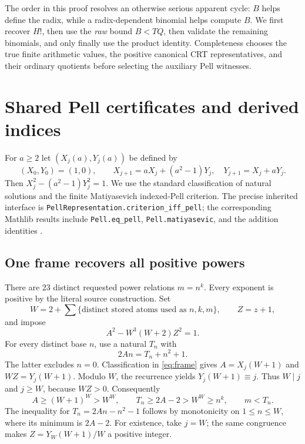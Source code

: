 \documentclass[10pt,letterpaper]{article}
\theoremstyle{definition}\newtheorem{definition}[theorem]{Definition}
\theoremstyle{remark}\newtheorem{remark}[theorem]{Remark}
\newcommand{\file}[1]{\texttt{\nolinkurl{#1}}}
\begin{document}
The order in this proof resolves an otherwise serious apparent cycle:
$B$ helps define the radix, while a radix-dependent binomial helps
compute $B$. We first recover $H!$, then use the \emph{raw} bound $B<TQ$,
then validate the remaining binomials, and only finally use the product
identity. Completeness chooses the true finite arithmetic values, the
positive canonical CRT representatives, and their ordinary quotients
before selecting the auxiliary Pell witnesses.

\section{Shared Pell certificates and derived indices}
\label{sec:pell}

For $a\ge2$ let $(X_j(a),Y_j(a))$ be defined by
\[
 (X_0,Y_0)=(1,0),\qquad
 X_{j+1}=aX_j+(a^2-1)Y_j,\quad Y_{j+1}=X_j+aY_j.
\]
Then $X_j^2-(a^2-1)Y_j^2=1$. We use the standard classification
of natural solutions and the finite Matiyasevich indexed-Pell criterion.
The precise inherited interface is
\file{PellRepresentation.criterion_iff_pell}; the corresponding Mathlib
results include \file{Pell.eq_pell}, \file{Pell.matiyasevic}, and the
addition identities \cite{mathlib,pellinterface}.

\subsection{One frame recovers all positive powers}

There are 23 distinct requested power relations $m=n^k$. Every exponent
is positive by the literal source construction. Set
\[
 W=2+\sum\{\text{distinct stored atoms used as }n,k,m\},\qquad Z=z+1,
\]
and impose
\begin{equation}\label{eq:frame}
 A^2-W^3(W+2)Z^2=1.
\end{equation}
For every distinct base $n$, use a natural $T_n$ with
\begin{equation}\label{eq:basemod}
 2An=T_n+n^2+1.
\end{equation}
The latter excludes $n=0$. Classification in \eqref{eq:frame} gives
$A=X_j(W+1)$ and $WZ=Y_j(W+1)$. Modulo $W$, the recurrence yields
$Y_j(W+1)\equiv j$. Thus $W\mid j$ and $j\ge W$, because $WZ>0$.
Consequently
\[
 A\ge(W+1)^W>W^W,
 \qquad T_n\ge2A-2>W^W\ge n^k,
 \qquad m<T_n.
\]
The inequality for $T_n=2An-n^2-1$ follows by monotonicity on
$1\le n\le W$, where its minimum is $2A-2$.
For existence, take $j=W$; the same congruence makes
$Z=Y_W(W+1)/W$ a positive integer.
\end{document}
